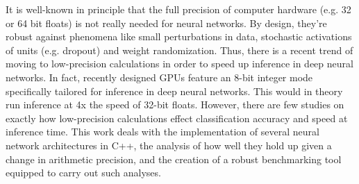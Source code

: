 It is well-known in principle that the full precision of computer hardware (e.g. 32 or 64 bit floats) is not really needed for neural networks. By design, they're robust against phenomena like small perturbations in data, stochastic activations of units (e.g. dropout) and weight randomization. Thus, there is a recent trend of moving to low-precision calculations in order to speed up inference in deep neural networks. In fact, recently designed GPUs feature an 8-bit integer mode specifically tailored for inference in deep neural networks. This would in theory run inference at 4x the speed of 32-bit floats. However, there are few studies on exactly how low-precision calculations effect classification accuracy and speed at inference time. This work deals with the implementation of several neural network architectures in C++, the analysis of how well they hold up given a change in arithmetic precision, and the creation of a robust benchmarking tool equipped to carry out such analyses.